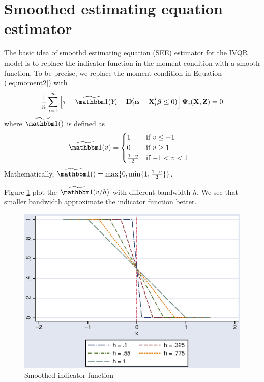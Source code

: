 \section{Smoothed estimating equation estimator}\label{sec:see_method}
The basic idea of smoothd estimating equation (SEE) estimator for the IVQR
model is to replace the indicator function in the moment condition with a smooth
function. To be precise, we replace the moment condition in Equation
(\ref{eq:moment2}) with
\begin{align}
\frac{1}{n}\sum_{i=1}^n \left[ \tau - \Is (Y_i  - \Db_i'\alphab - \Xb_i'\betab
\leq 0) \right] \Psib_i(\Xb, \Zb) = 0 \label{eq:moment_sgmm}
\end{align}
where $\Is()$ is defined as
\begin{align}
\Is(v) & =
\begin{cases}
  1 & \text{if $v \leq -1$} \\
  0 & \text{if $v \geq 1$}\\
  \frac{1-v}{2} &\text{if $-1 < v < 1$}
\end{cases}
\label{eq:Is}
\end{align}
Mathematically, $\Is() = \max\{0, \min\{1, \frac{1-v}{2}\}\}$.

Figure \ref{fig:sgmm} plot the $\Is(v/h)$ with different bandwidth $h$. We see
that smaller bandwidth approximate the indicator function better.

\begin{figure}[H]
\caption{Smoothed indicator function}
\label{fig:sgmm}
\centering
\includegraphics[scale=0.8]{eps/i_sgmm}
\end{figure}

